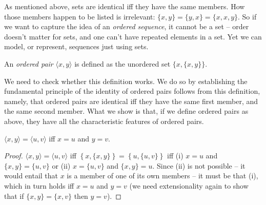 As mentioned above, sets are identical iff they have the same members. How those members happen to be listed is irrelevant: $\{x,y\}=\{y,x\}=\{x,x,y\}$. So if we want to capture the idea of an \emph{ordered sequence}, it cannot be a set – order doesn't matter for sets, and one can't have repeated elements in a set. Yet we can model, or represent, sequences just using sets.
\begin{definition} An \emph{ordered pair} $\langle x, y \rangle$ is defined as the unordered set $\bigl\{x,\{x,y\}\bigr\}$.
\end{definition}
We need to check whether this definition works. We do so by establishing the fundamental principle of the identity of ordered pairs follows from this definition, namely, that ordered pairs are identical iff they have the same first member, and the same second member. What we show is that, if we define ordered pairs as above, they have all the characteristic features of ordered pairs. 
\begin{theorem}\label{cridorpa}
$\langle x,y\rangle = \langle u,v\rangle$ iff $x=u$ and $y=v$.
\begin{proof}
	$\langle x,y\rangle = \langle u,v\rangle$ iff $\left\{x,\{x,y\}\right\} = \left\{u,\{u,v\}\right\}$ iff (i) $x=u$ and $\{x,y\} = \{u,v\}$ or (ii) $x=\{u,v\}$ and $\{x,y\}=u$. Since (ii) is not possible – it would entail that $x$ is a member of one of its own members – it must be that (i), which in turn holds iff $x=u$ and $y=v$ (we need extensionality again to show that if $\{x,y\}=\{x,v\}$ then $y=v$).
\end{proof}
\end{theorem}
